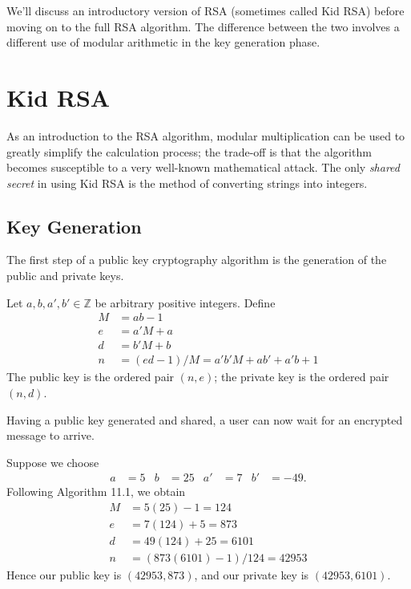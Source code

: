 \documentclass[m3380-lec-main.tex]{subfiles}
\begin{document}
We'll discuss an introductory version of RSA (sometimes called Kid RSA) before moving on to the full RSA algorithm. The difference between the two involves a different use of modular arithmetic in the key generation phase.

\section{Kid RSA} As an introduction to the RSA algorithm, modular multiplication can be used to greatly simplify the calculation process; the trade-off is that the algorithm becomes susceptible to a very well-known mathematical attack. The only \emph{shared secret} in using Kid RSA is the method of converting strings into integers. 

\subsection{Key Generation} The first step of a public key cryptography algorithm is the generation of the public and private keys.

\begin{alg}
Let $a,b,a',b'\in \mathbb{Z}$ be arbitrary positive integers.
Define
\begin{align*}
M &= ab-1 \\
e &= a'M+a \\
d &= b'M+b \\
n &= (ed-1)/M = a'b'M+ab'+a'b+1
\end{align*}
 The public key is the ordered pair $(n,e)$; the private key is the ordered pair $(n,d)$.
\end{alg}
Having a public key generated and shared, a user can now wait for an encrypted message to arrive.
\begin{exmp}
Suppose we choose
\begin{align*}
a &= 5 & b &= 25 & a' &= 7 & b' &= -49.
\end{align*}
Following Algorithm 11.1, we obtain
\begin{align*} 
M &= 5(25)-1 = 124 \\
e &= 7(124)+5 = 873 \\
d &= 49(124)+25 = 6101 \\
n &= (873(6101)-1)/124 = 42953
\end{align*}
Hence our public key is $(42953, 873)$, and our private key is $(42953, 6101)$.
\end{exmp}
\end{document}
